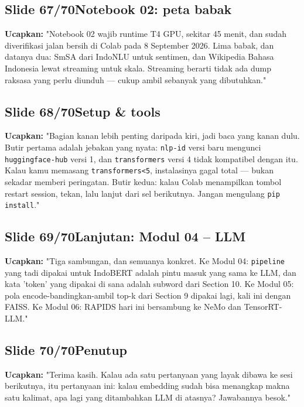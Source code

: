 \documentclass[11pt]{article}
\renewcommand{\framebox}[1]{\colorbox{acc!15}{\textcolor{acc}{\textbf{#1}}}}
\begin{document}
\subsection*{\framebox{Slide 67/70}\quad Notebook 02: peta babak}
\textbf{Ucapkan:} "Notebook 02 wajib runtime T4 GPU, sekitar 45 menit, dan sudah diverifikasi jalan bersih di Colab pada 8 September 2026. Lima babak, dan datanya dua: SmSA dari IndoNLU untuk sentimen, dan Wikipedia Bahasa Indonesia lewat streaming untuk skala. Streaming berarti tidak ada dump raksasa yang perlu diunduh — cukup ambil sebanyak yang dibutuhkan."\\[2pt]

\subsection*{\framebox{Slide 68/70}\quad Setup \& tools}
\textbf{Ucapkan:} "Bagian kanan lebih penting daripada kiri, jadi baca yang kanan dulu. Butir pertama adalah jebakan yang nyata: \texttt{nlp-id} versi baru mengunci \texttt{huggingface-hub} versi 1, dan \texttt{transformers} versi 4 tidak kompatibel dengan itu. Kalau kamu memasang \texttt{transformers<5}, instalasinya gagal total — bukan sekadar memberi peringatan. Butir kedua: kalau Colab menampilkan tombol restart session, tekan, lalu lanjut dari sel berikutnya. Jangan mengulang \texttt{pip install}."\\[2pt]

\subsection*{\framebox{Slide 69/70}\quad Lanjutan: Modul 04 -- LLM}
\textbf{Ucapkan:} "Tiga sambungan, dan semuanya konkret. Ke Modul 04: \texttt{pipeline} yang tadi dipakai untuk IndoBERT adalah pintu masuk yang sama ke LLM, dan kata 'token' yang dipakai di sana adalah subword dari Section 10. Ke Modul 05: pola encode-bandingkan-ambil top-k dari Section 9 dipakai lagi, kali ini dengan FAISS. Ke Modul 06: RAPIDS hari ini bersambung ke NeMo dan TensorRT-LLM."\\[2pt]

\subsection*{\framebox{Slide 70/70}\quad Penutup}
\textbf{Ucapkan:} "Terima kasih. Kalau ada satu pertanyaan yang layak dibawa ke sesi berikutnya, itu pertanyaan ini: kalau embedding sudah bisa menangkap makna satu kalimat, apa lagi yang ditambahkan LLM di atasnya? Jawabannya besok."\\[2pt]
\end{document}
